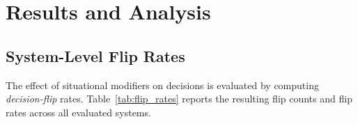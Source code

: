 \documentclass[11pt]{article}
\begin{document}
\section{Results and Analysis}
\label{sec:analysis}

\subsection{System-Level Flip Rates}
The effect of situational modifiers on decisions is evaluated by computing \emph{decision-flip} rates. Table~\ref{tab:flip_rates} reports the resulting flip counts and flip rates across all evaluated systems.


\end{document}
